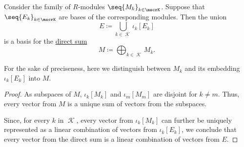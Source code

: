 \begin{proposition}\label{thm:basis_of_direct_sum}
  Consider the family of \( R \)-modules \( \seq{ M_k }_{k \in \mscrK} \). Suppose that \( \seq{ E_k }_{k \in \mscrK} \) are bases of the corresponding modules. Then the union
  \begin{equation*}
    E \coloneqq \bigcup_{k \in \mscrK} \iota_k[E_k]
  \end{equation*}
  is a basis for the \hyperref[def:external_semimodule_direct_sum]{direct sum}
  \begin{equation*}
    M \coloneqq \bigoplus_{k \in \mscrK} M_k.
  \end{equation*}
\end{proposition}
\begin{comments}
  \item For the sake of preciseness, here we distinguish between \( M_k \) and its embedding \( \iota_k[E_k] \) into \( M \).
\end{comments}
\begin{proof}
  As subspaces of \( M \), \( \iota_k[M_k] \) and \( \iota_m[M_m] \) are disjoint for \( k \neq m \). Thus, every vector from \( M \) is a unique sum of vectors from the subspaces.

  Since, for every \( k \) in \( \mscrK \), every vector from \( \iota_k[M_k] \) can further be uniquely represented as a linear combination of vectors from \( \iota_k[E_k] \), we conclude that every vector from the direct sum is a linear combination of vectors from \( E \).
\end{proof}


